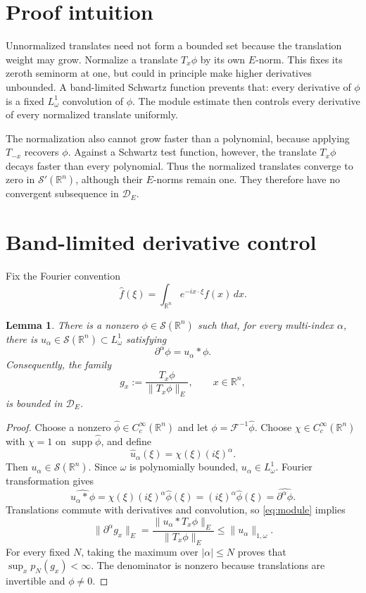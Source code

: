 \documentclass[11pt]{article}
\newtheorem{lemma}{Lemma}
\newcommand{\Dspace}{\mathcal D_E}
\newcommand{\Schwartz}{\mathcal S(\mathbb R^n)}
\newcommand{\Tempered}{\mathcal S'(\mathbb R^n)}
\begin{document}
\section{Proof intuition}

Unnormalized translates need not form a bounded set because the translation
weight may grow.  Normalize a translate $T_x\phi$ by its own $E$-norm.  This
fixes its zeroth seminorm at one, but could in principle make higher
derivatives unbounded.  A band-limited Schwartz function prevents that:
every derivative of $\phi$ is a fixed $L^1_\omega$ convolution of $\phi$.
The module estimate then controls every derivative of every normalized
translate uniformly.

The normalization also cannot grow faster than a polynomial, because applying
$T_{-x}$ recovers $\phi$.  Against a Schwartz test function, however, the
translate $T_x\phi$ decays faster than every polynomial.  Thus the normalized
translates converge to zero in $\Tempered$, although their $E$-norms remain
one.  They therefore have no convergent subsequence in $\Dspace$.

\section{Band-limited derivative control}

Fix the Fourier convention
\[
  \widehat f(\xi)=\int_{\mathbb R^n}e^{-ix\cdot\xi}f(x)\,dx.
\]

\begin{lemma}\label{lem:bandlimited}
There is a nonzero $\phi\in\Schwartz$ such that, for every multi-index
$\alpha$, there is $u_\alpha\in\Schwartz\subset L^1_\omega$ satisfying
\[
  \partial^\alpha\phi=u_\alpha*\phi.
\]
Consequently, the family
\[
  g_x:=\frac{T_x\phi}{\|T_x\phi\|_E},\qquad x\in\mathbb R^n,
\]
is bounded in $\Dspace$.
\end{lemma}

\begin{proof}
Choose a nonzero $\widehat\phi\in C_c^\infty(\mathbb R^n)$ and let
$\phi=\mathcal F^{-1}\widehat\phi$.  Choose
$\chi\in C_c^\infty(\mathbb R^n)$ with $\chi=1$ on
$\operatorname{supp}\widehat\phi$, and define
\[
  \widehat u_\alpha(\xi)=\chi(\xi)(i\xi)^\alpha.
\]
Then $u_\alpha\in\Schwartz$.  Since $\omega$ is polynomially bounded,
$u_\alpha\in L^1_\omega$.  Fourier transformation gives
\[
  \widehat{u_\alpha*\phi}
  =\chi(\xi)(i\xi)^\alpha\widehat\phi(\xi)
  =(i\xi)^\alpha\widehat\phi(\xi)
  =\widehat{\partial^\alpha\phi}.
\]
Translations commute with derivatives and convolution, so \eqref{eq:module}
implies
\[
 \|\partial^\alpha g_x\|_E
 =\frac{\|u_\alpha*T_x\phi\|_E}{\|T_x\phi\|_E}
 \leq \|u_\alpha\|_{1,\omega}.
\]
For every fixed $N$, taking the maximum over $|\alpha|\leq N$ proves that
$\sup_xp_N(g_x)<\infty$.  The denominator is nonzero because translations
are invertible and $\phi\neq0$.
\end{proof}
\end{document}
